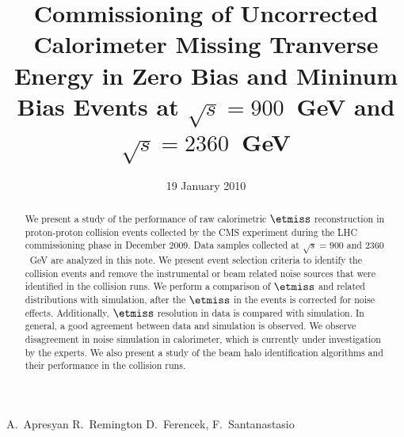 
\begin{titlepage}


   \date{19 January 2010}

  \title{Commissioning of Uncorrected Calorimeter Missing Tranverse Energy in Zero Bias and Mininum Bias Events at $\sqrt{s}=900$~GeV and $\sqrt{s}=2360$~GeV}

  \begin{Authlist}
    A.~Apresyan
    R.~Remington
    D.~Ferencek, F.~Santanastasio
  \end{Authlist}



  \begin{abstract}
    
    We present a study of the performance of raw calorimetric $\etmiss$ reconstruction in
    proton-proton collision events collected by the CMS experiment during the LHC
    commissioning phase in December 2009. Data samples collected at
    $\sqrt{s}=900$ and $2360$~GeV are analyzed in this note. We present
     event selection criteria to identify the collision events and remove the instrumental or beam
    related noise sources that were identified in the collision
    runs. We perform a comparison of $\etmiss$ and related distributions with
    simulation, after the $\etmiss$ in the events is corrected for noise
    effects. Additionally, $\etmiss$ resolution in data is
    compared with simulation. In general, a good agreement between data and simulation is
    observed. We observe disagreement in noise simulation in
    calorimeter, which is currently under investigation by the
    experts. We also present a study of the beam halo identification
    algorithms and their performance in the collision runs.

  \end{abstract} 

  
\end{titlepage}

